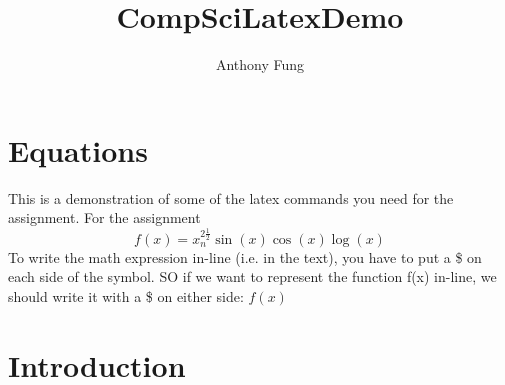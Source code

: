 \documentclass{article} %
\title{CompSciLatexDemo}
\author{Anthony Fung}
\date{\date} %
\begin{document}

\maketitle

\section{Equations}

This is a demonstration of some of the latex commands you need for the assignment.
For the assignment
\begin{equation}
f(x) = x_n^{2 \frac{1}{2} } \sin{(x)} \cos{(x)} \log{(x)}
\end{equation}
To write the math expression in-line (i.e. in the text), you have to put a \$ on each side of the symbol. SO if we want to represent the function f(x) in-line,  we should write it with a \$ on either side: $f(x)$



\section{Introduction}
\end{document}
